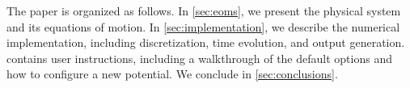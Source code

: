 \documentclass[aps, nofootinbib,superscriptaddress, preprintnumbers, longbibliography]{article}
\begin{document}
The paper is organized as follows. In \cref{sec:eoms}, we present the physical system and its equations of motion. In \cref{sec:implementation}, we describe the numerical implementation, including discretization, time evolution, and output generation.  contains user instructions, including a walkthrough of the default options and how to configure a new potential. We conclude in \cref{sec:conclusions}.



\end{document}
